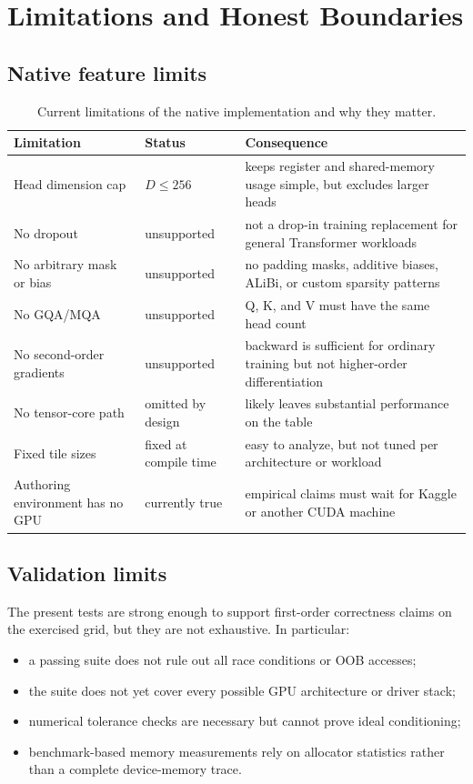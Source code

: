 \chapter{Limitations and Honest Boundaries}
\label{chap:limitations}

\section{Native feature limits}

\begin{table}[htbp]
\centering
\caption{Current limitations of the native implementation and why they matter.}
\label{tab:limitations}
\begin{tabularx}{\textwidth}{@{}p{} p{} X@{}}
\toprule
Limitation & Status & Consequence \\
\midrule
Head dimension cap & $D \le 256$ & keeps register and shared-memory usage simple, but excludes larger heads \\
No dropout & unsupported & not a drop-in training replacement for general Transformer workloads \\
No arbitrary mask or bias & unsupported & no padding masks, additive biases, ALiBi, or custom sparsity patterns \\
No GQA/MQA & unsupported & Q, K, and V must have the same head count \\
No second-order gradients & unsupported & backward is sufficient for ordinary training but not higher-order differentiation \\
No tensor-core path & omitted by design & likely leaves substantial performance on the table \\
Fixed tile sizes & fixed at compile time & easy to analyze, but not tuned per architecture or workload \\
Authoring environment has no GPU & currently true & empirical claims must wait for Kaggle or another CUDA machine \\
\bottomrule
\end{tabularx}
\end{table}

\section{Validation limits}

The present tests are strong enough to support first-order correctness claims on the exercised grid, but they are not exhaustive. In particular:
\begin{itemize}
  \item a passing suite does not rule out all race conditions or OOB accesses;
  \item the suite does not yet cover every possible GPU architecture or driver stack;
  \item numerical tolerance checks are necessary but cannot prove ideal conditioning;
  \item benchmark-based memory measurements rely on allocator statistics rather than a complete device-memory trace.
\end{itemize}

